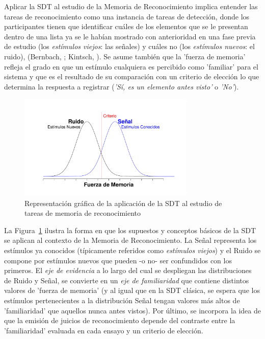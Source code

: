 Aplicar la SDT al estudio de la Memoria de Reconocimiento implica entender las tareas de reconocimiento como una instancia de tareas de detección, donde los participantes tienen que identificar cuáles de los elementos que se le presentan dentro de una lista ya se le habían mostrado con anterioridad en una fase previa de estudio (los \textit{estímulos viejos}: las señales) y cuáles no (los \textit{estímulos nuevos}: el ruido), (Bernbach, \citeyear{Bernbach1967}; Kintsch, \citeyear{Kintsch1967}). Se asume también que la 'fuerza de memoria' refleja el grado en que un estímulo cualquiera es percibido como 'familiar' para el sistema y que es el resultado de su comparación con un criterio de elección lo que determina la respuesta a registrar (\textit{'Sí, es un elemento antes visto'} o \textit{'No'}).\\ 

\begin{figure}[th]
\centering
\includegraphics[width=0.75\textwidth]{Figures/RM_SDT_1} 
\caption[SDT aplicada a tareas de memoria de reconocimiento]{Representación gráfica de la aplicación de la SDT al estudio de tareas de memoria de reconocimiento}
\label{fig:RM_SDT_1}
\end{figure}

La Figura~\ref{fig:RM_SDT_1} ilustra la forma en que los supuestos y conceptos básicos de la SDT se aplican al contexto de la Memoria de Reconocimiento. La Señal representa los estímulos ya conocidos (típicamente referidos como \textit{estímulos viejos}) y el Ruido se compone por estímulos nuevos que pueden -o no- ser confundidos con los primeros. El \textit{eje de evidencia} a lo largo del cual se despliegan las distribuciones de Ruido y Señal, se convierte en un \textit{eje de familiaridad} que contiene distintos valores de 'fuerza de memoria' (y al igual que en la SDT clásica, se espera que los estímulos pertenecientes a la distribución Señal tengan valores más altos de 'familiaridad' que aquellos nunca antes vistos). Por último, se incorpora la idea de que la emisión de juicios de reconocimiento depende del contraste entre la 'familiaridad' evaluada en cada ensayo y un criterio de elección.\\

